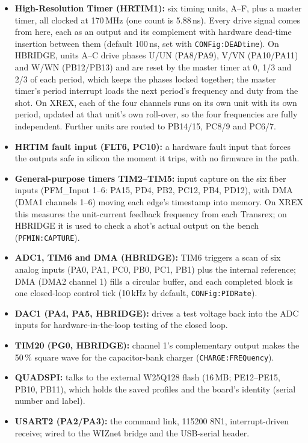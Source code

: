 \documentclass[11pt]{article}
\begin{document}
\begin{itemize}
  \item \textbf{High-Resolution Timer (HRTIM1):} six timing units, A--F, plus a master timer, all clocked at 170\,MHz (one count is 5.88\,ns). Every drive signal comes from here, each as an output and its complement with hardware dead-time insertion between them (default 100\,ns, set with \texttt{CONFig:DEADtime}). On HBRIDGE, units A--C drive phases U/UN (PA8/PA9), V/VN (PA10/PA11) and W/WN (PB12/PB13) and are reset by the master timer at 0, 1/3 and 2/3 of each period, which keeps the phases locked together; the master timer's period interrupt loads the next period's frequency and duty from the shot. On XREX, each of the four channels runs on its own unit with its own period, updated at that unit's own roll-over, so the four frequencies are fully independent. Further units are routed to PB14/15, PC8/9 and PC6/7.
  \item \textbf{HRTIM fault input (FLT6, PC10):} a hardware fault input that forces the outputs safe in silicon the moment it trips, with no firmware in the path.
  \item \textbf{General-purpose timers TIM2--TIM5:} input capture on the six fiber inputs (PFM\_Input 1--6: PA15, PD4, PB2, PC12, PB4, PD12), with DMA (DMA1 channels 1--6) moving each edge's timestamp into memory. On XREX this measures the unit-current feedback frequency from each Transrex; on HBRIDGE it is used to check a shot's actual output on the bench (\texttt{PFMIN:CAPTURE}).
  \item \textbf{ADC1, TIM6 and DMA (HBRIDGE):} TIM6 triggers a scan of six analog inputs (PA0, PA1, PC0, PB0, PC1, PB1) plus the internal reference; DMA (DMA2 channel 1) fills a circular buffer, and each completed block is one closed-loop control tick (10\,kHz by default, \texttt{CONFig:PIDRate}).
  \item \textbf{DAC1 (PA4, PA5, HBRIDGE):} drives a test voltage back into the ADC inputs for hardware-in-the-loop testing of the closed loop.
  \item \textbf{TIM20 (PG0, HBRIDGE):} channel 1's complementary output makes the 50\,\% square wave for the capacitor-bank charger (\texttt{CHARGE:FREQuency}).
  \item \textbf{QUADSPI:} talks to the external W25Q128 flash (16\,MB; PE12--PE15, PB10, PB11), which holds the saved profiles and the board's identity (serial number and label).
  \item \textbf{USART2 (PA2/PA3):} the command link, 115200 8N1, interrupt-driven receive; wired to the WIZnet bridge and the USB-serial header.

\end{itemize}
\end{document}

